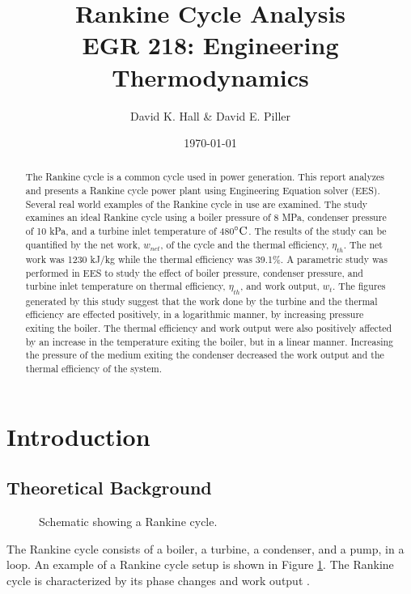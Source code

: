 \documentclass[12pt, letterpaper]{article}
\title{\textbf{Rankine Cycle Analysis} \\ \Large EGR 218: Engineering Thermodynamics}
\author{David K. Hall \& David E. Piller}
\date{\today}
\begin{document}
\maketitle
\thispagestyle{empty}

\newpage

\begin{abstract}
  The Rankine cycle is a common cycle used in power generation. This report analyzes and presents a Rankine cycle power plant using Engineering Equation solver (EES). Several real world examples of the Rankine cycle in use are examined. The study examines an ideal Rankine cycle using a boiler pressure of 8 MPa, condenser pressure of 10 kPa, and a turbine inlet temperature of 480$^\circ\text{C}$. The results of the study can be quantified by the net work, $w_{net}$, of the cycle and the thermal efficiency, $\eta_{th}$. The net work was 1230 kJ/kg while the thermal efficiency was 39.1\%. A parametric study was performed in EES to study the effect of boiler pressure, condenser pressure, and turbine inlet temperature on thermal efficiency, $\eta_{th}$, and work output, $w_t$. The figures generated by this study suggest that the work done by the turbine and the thermal efficiency are effected positively, in a logarithmic manner, by increasing pressure exiting the boiler. The thermal efficiency and work output were also positively affected by an increase in the temperature exiting the boiler, but in a linear manner. Increasing the pressure of the medium exiting the condenser decreased the work output and the thermal efficiency of the system.

\end{abstract}

\tableofcontents

\newpage

\section{Introduction}

\subsection{Theoretical Background}

\begin{figure}
  \centering
\rankineSchematic
\caption{Schematic showing a Rankine cycle.}
\label{fig:schematic}
\end{figure}

The Rankine cycle consists of a boiler, a turbine, a condenser, and a pump, in a loop. An example of a Rankine cycle setup is shown in Figure \ref{fig:schematic}. The Rankine cycle is characterized by its phase changes and work output \cite{MIT}.
\end{document}
